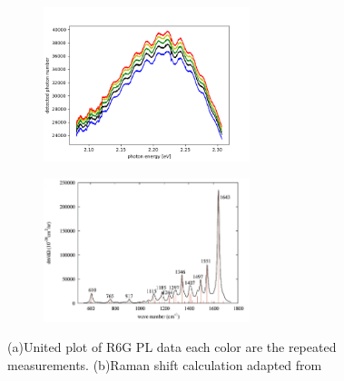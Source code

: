 \documentclass{article}
\begin{document}
 \begin{figure}[ht]
  \centering
  \begin{subfigure}[b]{6cm}
      \centering
      \includegraphics[width=6cm]{../results/R6G_total_fig.png}
      \caption{}
  \end{subfigure}
  \hfill
  \begin{subfigure}[b]{6cm}
      \centering
      \includegraphics[width=6cm]{../results/Raman_shift.png}
      \caption{}
  \end{subfigure}
  \hfill
  \caption{(a)United plot of R6G PL data each color are the repeated measurements. (b)Raman shift calculation adapted from \cite{rhodamine_HOMO_LUMO}}
  \label{fig:R6G total fig}
\end{figure}
\end{document}
